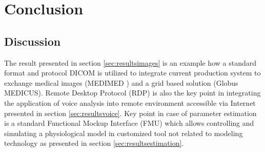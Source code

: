 \chapter{Conclusion}
\label{sec:conclusion}

\section{Discussion}
\label{sec:discussion}



The result presented in section \ref{sec:resultsimages} is an example how a standard format and protocol DICOM is utilized to integrate current production system to exchange medical images (MEDIMED \cite{Slavicek2010}) and a grid based solution (Globus MEDICUS\cite{Erberich2007}). Remote Desktop Protocol (RDP) is also the key point in integrating the application of voice analysis\cite{Fric2007} into remote environment accessible via Internet presented in section \ref{sec:resultsvoice}. Key point in case of parameter estimation is a standard Functional Mockup Interface (FMU)\cite{Blochwitza} which allows controlling and simulating a physiological model in customized tool not related to modeling technology as presented in section \ref{sec:resultsestimation}. 

